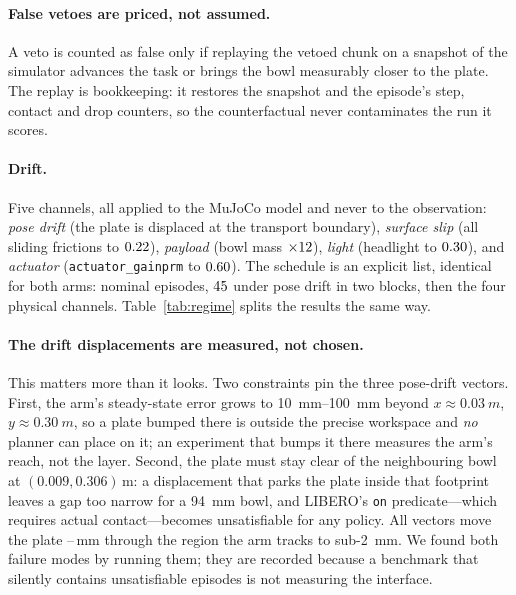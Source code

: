 \documentclass[conference]{IEEEtran}
\theoremstyle{definition}
\newcommand{\code}[1]{\texttt{#1}}
\begin{document}
\paragraph{False vetoes are priced, not assumed.} A veto is counted as false
only if replaying the vetoed chunk on a snapshot of the simulator advances the
task or brings the bowl measurably closer to the plate. The replay is
bookkeeping: it restores the snapshot and the episode's step, contact and drop
counters, so the counterfactual never contaminates the run it scores.

\paragraph{Drift.} Five channels, all applied to the MuJoCo model and never to
the observation: \emph{pose drift} (the plate is displaced at the transport
boundary), \emph{surface slip} (all sliding frictions to $0.22$),
\emph{payload} (bowl mass $\times12$), \emph{light} (headlight to $0.30$), and
\emph{actuator} (\code{actuator\_gainprm} to $0.60$). The schedule is an
explicit list, identical for both arms: \SafeNominalN{} nominal episodes,
$45$ under pose drift in two blocks, then the four physical
channels. Table~\ref{tab:regime} splits the results the same way.

\paragraph{The drift displacements are measured, not chosen.} This matters more
than it looks. Two constraints pin the three pose-drift vectors. First, the
arm's steady-state error grows to \SIrange{10}{100}{mm} beyond
$x\approx\SI{0.03}{m}$, $y\approx\SI{0.30}{m}$, so a plate bumped there is
outside the precise workspace and \emph{no} planner can place on it; an
experiment that bumps it there measures the arm's reach, not the layer.
Second, the plate must stay clear of the neighbouring bowl at
$(0.009, 0.306)$\,m: a displacement that parks the plate inside that footprint
leaves a gap too narrow for a \SI{94}{mm} bowl, and LIBERO's \code{on}
predicate---which requires actual contact---becomes unsatisfiable for any
policy. All \PoseDeltaCount{} vectors move the plate \PoseDeltaMin--\PoseDeltaMax\,mm through
the region the arm tracks to sub-\SI{2}{mm}. We found both failure modes by
running them; they are recorded because a benchmark that silently contains
unsatisfiable episodes is not measuring the interface.
\end{document}
